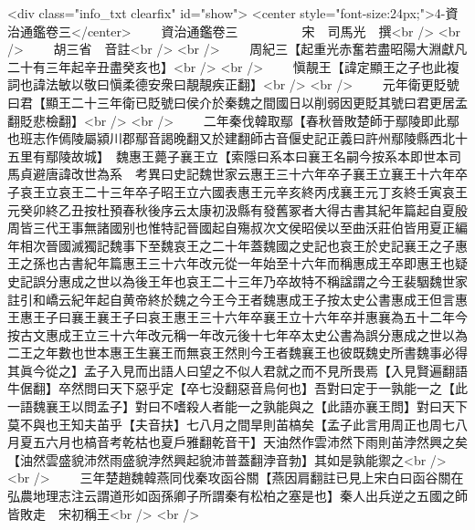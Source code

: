 <div class="info_txt clearfix" id="show">
<center style="font-size:24px;">4-資治通鑑卷三</center>
  　　資治通鑑卷三　　　　　宋　司馬光　撰<br />
<br />
　　胡三省　音註<br />
<br />
　　周紀三【起重光赤奮若盡昭陽大淵獻凡二十有三年起辛丑盡癸亥也】<br />
<br />
　　愼靚王【諱定顯王之子也此複詞也諱法敏以敬曰愼柔德安衆曰靚靚疾正翻】<br />
<br />
　　元年衛更貶號曰君【顯王二十三年衛已貶號曰侯介於秦魏之間國日以削弱因更貶其號曰君更居孟翻貶悲檢翻】<br />
<br />
　　二年秦伐韓取鄢【春秋晉敗楚師于鄢陵即此鄢也班志作傿陵屬潁川郡鄢音謁晚翻又於建翻師古音偃史記正義曰許州鄢陵縣西北十五里有鄢陵故城】　魏惠王薨子襄王立【索隱曰系本曰襄王名嗣今按系本即世本司馬貞避唐諱改世為系　考異曰史記魏世家云惠王三十六年卒子襄王立襄王十六年卒子哀王立哀王二十三年卒子昭王立六國表惠王元辛亥終丙戌襄王元丁亥終壬寅哀王元癸卯終乙丑按杜預春秋後序云太康初汲縣有發舊冢者大得古書其紀年篇起自夏殷周皆三代王事無諸國别也惟特記晉國起自殤叔次文侯昭侯以至曲沃莊伯皆用夏正編年相次晉國滅獨記魏事下至魏哀王之二十年蓋魏國之史記也哀王於史記襄王之子惠王之孫也古書紀年篇惠王三十六年改元從一年始至十六年而稱惠成王卒即惠王也疑史記誤分惠成之世以為後王年也哀王二十三年乃卒故特不稱諡謂之今王裴駰魏世家註引和嶠云紀年起自黄帝終於魏之今王今王者魏惠成王子按太史公書惠成王但言惠王惠王子曰襄王襄王子曰哀王惠王三十六年卒襄王立十六年卒并惠襄為五十二年今按古文惠成王立三十六年改元稱一年改元後十七年卒太史公書為誤分惠成之世以為二王之年數也世本惠王生襄王而無哀王然則今王者魏襄王也彼既魏史所書魏事必得其眞今從之】孟子入見而出語人曰望之不似人君就之而不見所畏焉【入見賢遍翻語牛倨翻】卒然問曰天下惡乎定【卒七没翻惡音烏何也】吾對曰定于一孰能一之【此一語魏襄王以問孟子】對曰不嗜殺人者能一之孰能與之【此語亦襄王問】對曰天下莫不與也王知夫苖乎【夫音扶】七八月之間旱則苖槁矣【孟子此言用周正也周七八月夏五六月也槁音考乾枯也夏戶雅翻乾音干】天油然作雲沛然下雨則苖浡然興之矣【油然雲盛貌沛然雨盛貌浡然興起貌沛普蓋翻浡音勃】其如是孰能禦之<br />
<br />
　　三年楚趙魏韓燕同伐秦攻函谷關【燕因肩翻註已見上宋白曰函谷關在弘農地理志注云謂道形如函孫卿子所謂秦有松柏之塞是也】秦人出兵逆之五國之師皆敗走　宋初稱王<br />
<br />
